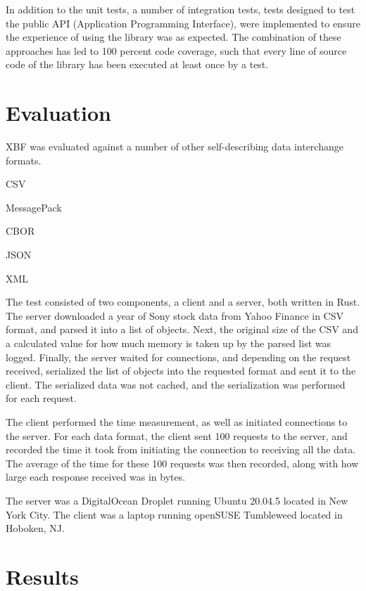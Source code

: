 \documentclass[conference]{IEEEtran}
\begin{document}
In addition to the unit tests, a number of integration tests, tests designed to test the public API (Application Programming Interface), were implemented to ensure the experience of using the library was as expected. The combination of these approaches has led to 100 percent code coverage, such that every line of source code of the library has been executed at least once by a test.

\section{Evaluation}

XBF was evaluated against a number of other self-describing data interchange formats.

\begin{IEEEitemize}
	\item CSV\cite{csv_parser}
	\item MessagePack\cite{msgpack_parser}
	\item CBOR\cite{cbor_parser}
	\item JSON\cite{json_parser}
	\item XML\cite{xml_parser}
\end{IEEEitemize}

The test consisted of two components, a client and a server, both written in Rust. The server downloaded a year of Sony stock data from Yahoo Finance\cite{sony_stock_data} in CSV format, and parsed it into a list of objects. Next, the original size of the CSV and a calculated value for how much memory is taken up by the parsed list was logged. Finally, the server waited for connections, and depending on the request received, serialized the list of objects into the requested format and sent it to the client. The serialized data was not cached, and the serialization was performed for each request.

The client performed the time measurement, as well as initiated connections to the server. For each data format, the client sent 100 requests to the server, and recorded the time it took from initiating the connection to receiving all the data. The average of the time for these 100 requests was then recorded, along with how large each response received was in bytes.

The server was a DigitalOcean Droplet\cite{digital_ocean} running Ubuntu 20.04.5 located in New York City. The client was a laptop running openSUSE Tumbleweed located in Hoboken, NJ.

\section{Results}
\end{document}
